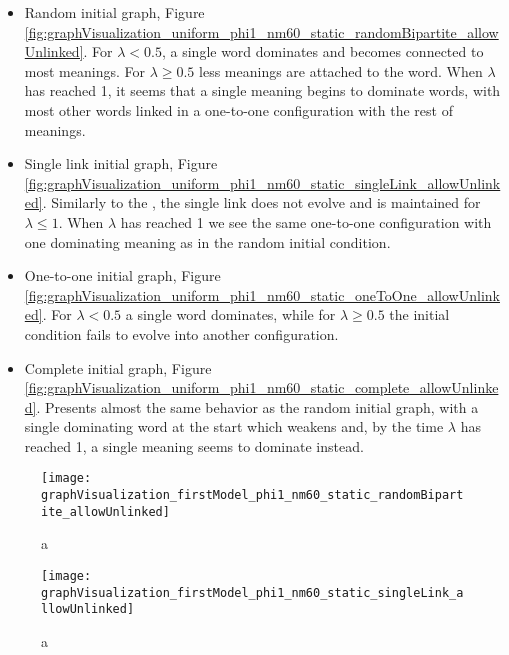 \begin{redenv}
  \begin{itemize}
  \item Random initial graph, Figure \ref{fig:graphVisualization_uniform_phi1_nm60_static_randomBipartite_allowUnlinked}.
    For $\lambda < 0.5$, a single word dominates and becomes connected to most meanings.
    For $\lambda \geq 0.5$ less meanings are attached to the word.
    When $\lambda$ has reached 1, it seems that a single meaning begins to dominate words, with most other words linked in a one-to-one configuration with the rest of meanings.
  \item Single link initial graph, Figure \ref{fig:graphVisualization_uniform_phi1_nm60_static_singleLink_allowUnlinked}.
    Similarly to the \firstmodel{}, the single link does not evolve and is maintained for $\lambda \leq 1$.
    When $\lambda$ has reached 1 we see the same one-to-one configuration with one dominating meaning as in the random initial condition.
  \item One-to-one initial graph, Figure \ref{fig:graphVisualization_uniform_phi1_nm60_static_oneToOne_allowUnlinked}.
    For $\lambda < 0.5$ a single word dominates, while for $\lambda \geq 0.5$ the initial condition fails to evolve into another configuration.
  \item Complete initial graph, Figure \ref{fig:graphVisualization_uniform_phi1_nm60_static_complete_allowUnlinked}.
    Presents almost the same behavior as the random initial graph, with a single dominating word at the start which weakens and, by the time $\lambda$ has reached 1, a single meaning seems to dominate instead.
  \end{itemize}
\end{redenv}

\begin{figure}
  \centering
  \texttt{[image: graphVisualization\_firstModel\_phi1\_nm60\_static\_randomBipartite\_allowUnlinked]}
  \caption{a}
  \label{fig:graphVisualization_firstModel_phi1_nm60_static_randomBipartite_allowUnlinked}
\end{figure}

\begin{figure}
  \centering
  \texttt{[image: graphVisualization\_firstModel\_phi1\_nm60\_static\_singleLink\_allowUnlinked]}
  \caption{a}
  \label{fig:graphVisualization_firstModel_phi1_nm60_static_singleLink_allowUnlinked}
\end{figure}

